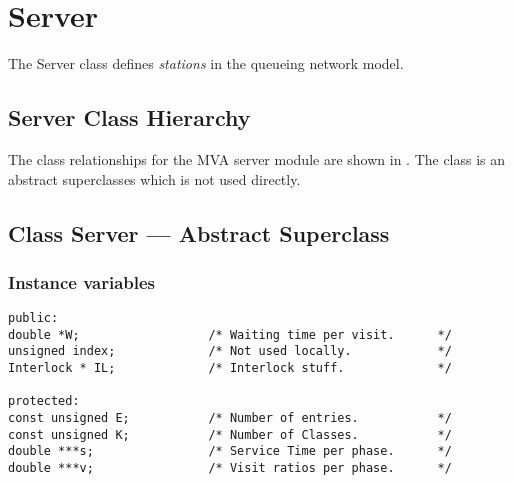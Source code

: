 % 
\section{Server}
\label{sec:server}

The Server class defines {\em stations\/} in the queueing network
model.  


\subsection{Server Class Hierarchy}
\label{sec:server-hierarchy}

The class relationships for the MVA server module are shown in
.  The class
 is an abstract superclasses which is not used directly.

\begin{figure}[htbp]
  \label{fig:server}
  \begin{center}
  \end{center}
\end{figure}

\htmlrule
%
%
\subsection{Class Server  --- Abstract Superclass}
\subsubsection{Instance variables}
\label{sec:server-ivars}

\begin{verbatim}
public:
double *W;                  /* Waiting time per visit.      */
unsigned index;             /* Not used locally.            */
Interlock * IL;             /* Interlock stuff.             */

protected:             
const unsigned E;           /* Number of entries.           */
const unsigned K;           /* Number of Classes.           */
double ***s;                /* Service Time per phase.      */
double ***v;                /* Visit ratios per phase.      */
\end{verbatim}

